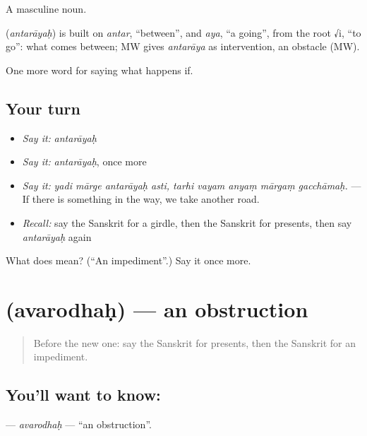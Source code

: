 A masculine noun.

\begin{cousinweb}
\textbf{} (\emph{antarāyaḥ}) is built on \emph{antar}, \textquotedblleft{}between\textquotedblright{}, and \emph{aya}, \textquotedblleft{}a going\textquotedblright{}, from the root √i, \textquotedblleft{}to go\textquotedblright{}: what comes between; MW gives \emph{antarāya} as intervention, an obstacle (MW).
\end{cousinweb}

\begin{grammarlens}[title={What you've built}]
One more word for saying what happens if.
\end{grammarlens}

\subsection*{Your turn}
\begin{itemize}
\raggedright
  \item \emph{Say it:} \emph{antarāyaḥ}
  \item \emph{Say it:} \emph{antarāyaḥ}, once more
  \item \emph{Say it:} \emph{yadi mārge antarāyaḥ asti, tarhi vayam anyaṃ mārgaṃ gacchāmaḥ.} — If there is something in the way, we take another road.
  \item \emph{Recall:} say the Sanskrit for a girdle, then the Sanskrit for presents, then say \emph{antarāyaḥ} again
\end{itemize}

\begin{tcolorbox}[breakable,colback=teal!4,colframe=teal!35!black,title={Before you move on}]
What does  mean? (\textquotedblleft{}An impediment\textquotedblright{}.) Say it once more.
\end{tcolorbox}
\section[\texorpdfstring{\sk{अवरोधः} (avarodhaḥ)}{अवरोधः (avarodhaḥ)}]{ (avarodhaḥ) — an obstruction}

\label{lesson:SA-C533-avarodhah}



\begin{quote}
Before the new one: say the Sanskrit for presents, then the Sanskrit for an impediment.
\end{quote}

\subsection*{You'll want to know: }
\textbf{} — \emph{avarodhaḥ} — \textquotedblleft{}an obstruction\textquotedblright{}.

